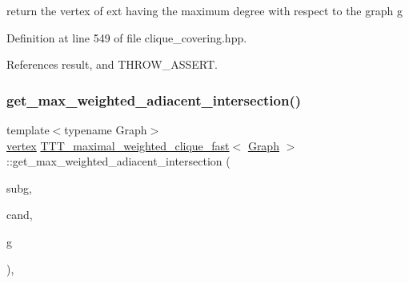 return the vertex of ext having the maximum degree with respect to the graph g 



Definition at line 549 of file clique\+\_\+covering.\+hpp.



References result, and T\+H\+R\+O\+W\+\_\+\+A\+S\+S\+E\+RT.

\mbox{\label{classTTT__maximal__weighted__clique__fast_ad79a189918a27200d2fbb7c4d99e8603}} 
\subsubsection{\texorpdfstring{get\+\_\+max\+\_\+weighted\+\_\+adiacent\+\_\+intersection()}{get\_max\_weighted\_adiacent\_intersection()}}
{\footnotesize\ttfamily template$<$typename Graph$>$ \\
\hyperlink{classTTT__maximal__weighted__clique__fast_a55ca1f8931415f7338827925b86c218d}{vertex} \hyperlink{classTTT__maximal__weighted__clique__fast}{T\+T\+T\+\_\+maximal\+\_\+weighted\+\_\+clique\+\_\+fast}$<$ \hyperlink{structGraph}{Graph} $>$\+::get\+\_\+max\+\_\+weighted\+\_\+adiacent\+\_\+intersection (\begin{DoxyParamCaption}\item[{const \hyperlink{classCustomUnorderedSet}{Custom\+Unordered\+Set}$<$ \hyperlink{classTTT__maximal__weighted__clique__fast_a55ca1f8931415f7338827925b86c218d}{vertex} $>$ \&}]{subg,  }\item[{const \hyperlink{classCustomUnorderedSet}{Custom\+Unordered\+Set}$<$ \hyperlink{classTTT__maximal__weighted__clique__fast_a55ca1f8931415f7338827925b86c218d}{vertex} $>$ \&}]{cand,  }\item[{const \hyperlink{structGraph}{Graph} \&}]{g }\end{DoxyParamCaption})\hspace{0.3cm}{\ttfamily [inline]}, {\ttfamily [private]}}




